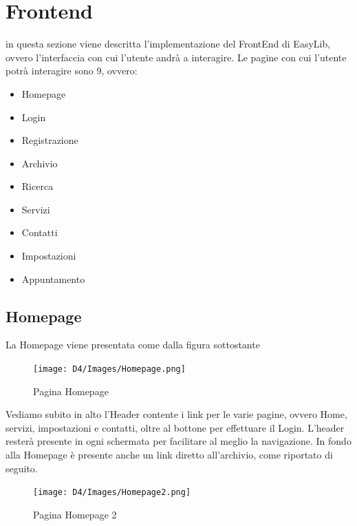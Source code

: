\documentclass{article}
\begin{document}
\section{Frontend} 
in questa sezione viene descritta l'implementazione del FrontEnd di EasyLib, ovvero l'interfaccia con cui l'utente andrà a interagire.
Le pagine con cui l'utente potrà interagire sono 9, ovvero:
\begin{itemize}
    \item Homepage
    \item Login
    \item Registrazione
    \item Archivio
    \item Ricerca
    \item Servizi
    \item Contatti
    \item Impostazioni
    \item Appuntamento
\end{itemize}

\subsection{Homepage} \label{Homepage}
La Homepage viene presentata come dalla figura sottostante
\begin{figure}[H]
     \centering
     \texttt{[image: D4/Images/Homepage.png]}
     \caption{Pagina Homepage}
    \end{figure}

Vediamo subito in alto l'Header contente i link per le varie pagine, ovvero Home, servizi, impostazioni e contatti, oltre al bottone per effettuare il Login.
L'header resterà presente in ogni schermata per facilitare al meglio la navigazione.
 In fondo alla Homepage è presente anche un link diretto all'archivio, come riportato di seguito.
 \begin{figure}[H]
     \centering
     \texttt{[image: D4/Images/Homepage2.png]}
     \caption{Pagina Homepage 2}
    \end{figure}
\end{document}
